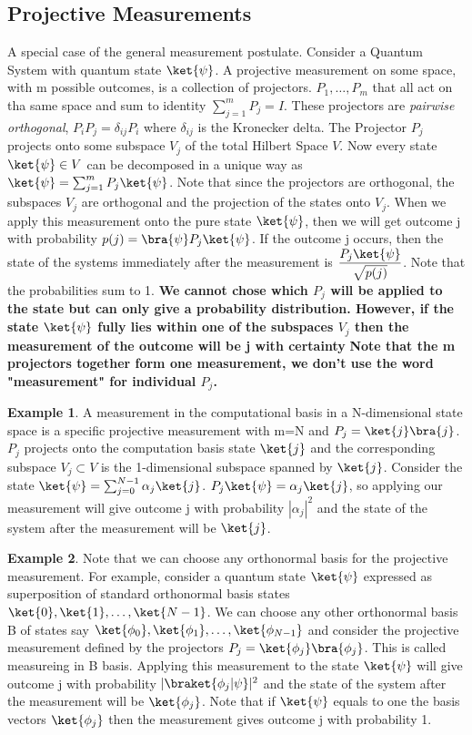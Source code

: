 \documentclass[12pt, oneside]{book}
\theoremstyle{definition}
\theoremstyle{definition}
\newtheorem{example}{Example}[section]
\theoremstyle{remark}
\begin{document}
\subsection{Projective Measurements}
A special case of the general measurement postulate. Consider a Quantum System with quantum state $\ket{\psi}$. A projective measurement on some space, with m possible outcomes, is a collection of projectors.
$P_1,\ldots,P_m$ that all act on tha same space and sum to identity $\sum_{j=1}^m P_j=I$. These projectors are \textit{pairwise orthogonal},
$P_iP_j=\delta_{ij}P_i$ where $\delta_{ij}$ is the Kronecker delta. The Projector $P_j$ projects onto some subspace $V_j$ of the total Hilbert Space $V$. 
Now every state $\ket{\psi} \in V$ can be decomposed in a unique way as $\ket{\psi}=\sum_{j=1}^m P_j\ket{\psi}$. Note that since the projectors
are orthogonal, the subspaces $V_j$ are orthogonal and the projection of the states onto $V_j$. When we apply this measurement onto the pure
state $\ket{\psi}$, then we will get outcome j with probability $p(j)=\bra{\psi}P_j\ket{\psi}$. If the outcome j occurs, then the state of the systems
immediately after the measurement is $\dfrac{P_j\ket{\psi}}{\sqrt{p(j)}}$. Note that the probabilities sum to 1.
\textbf{We cannot chose which $P_j$ will be applied to the state but can only give a probability distribution. However, if the state $\ket{\psi}$ fully lies within
one of the subspaces $V_j$ then the measurement of the outcome will be j with certainty}
\textbf{Note that the m projectors together form one measurement, we don't use the word "measurement" for individual $P_j$.}
\begin{example}
    A measurement in the computational basis in a N-dimensional state space is a specific projective measurement
    with m=N and $P_j=\ket{j}\bra{j}$. $P_j$ projects onto the computation basis state $\ket{j}$ and the corresponding
    subspace $V_j \subset V$  is the 1-dimensional subspace spanned by $\ket{j}$. 
    Consider the state $\ket{\psi} = \sum_{j=0}^{N-1} \alpha_j \ket{j}$. $P_j\ket{\psi}=\alpha_j\ket{j}$, so applying our measurement
    will give outcome j with probability $|\alpha_j|^2$ and the state of the system after the measurement will be $\ket{j}$.
\end{example}


\begin{example}
    Note that we can choose any orthonormal basis for the projective measurement. For example, consider
    a quantum state $\ket{\psi}$ expressed as superposition of standard orthonormal basis states $\ket{0},\ket{1},\ldots,\ket{N-1}$. 
    We can choose any other orthonormal basis B of states say $\ket{\phi_0},\ket{\phi_1},\ldots,\ket{\phi_{N-1}}$
    and consider the projective measurement defined by the projectors $P_j=\ket{\phi_j}\bra{\phi_j}$.
    This is called measureing in B basis. Applying this measurement to the state $\ket{\psi}$ will give 
    outcome j with probability $|\braket{\phi_j|\psi}|^2$ and the state of the system after the measurement will be $\ket{\phi_j}$.
    Note that if $\ket{\psi}$ equals to one the basis vectors $\ket{\phi_j}$ then the measurement
    gives outcome j with probability 1.
\end{example}
\end{document}
